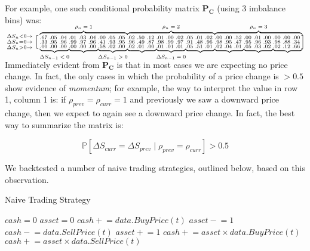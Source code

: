 \documentclass[12pt]{article}
\newcommand{\pluseq}{\mathrel{+}=}
\newcommand{\mineq}{\mathrel{-}=}
\newcommand\undermat[2]{%
  \makebox[0pt][l]{$\smash{\underbrace{\phantom{%
    \begin{smallmatrix}#2\end{smallmatrix}}}_{\text{$#1$}}}$}#2}
\newcommand\overmat[2]{%
  \makebox[0pt][l]{$\smash{\overbrace{\phantom{%
    \begin{smallmatrix}#2\end{smallmatrix}}}^{\text{$#1$}}}$}#2}
\newcommand\mat[1]{\boldsymbol{#1}}
\begin{document}
For example, one such conditional probability matrix $\mat{P_C}$ (using 3 imbalance bins) was:

$$  \begin{smallmatrix}
    \Delta S_n < 0 \rightarrow \\
    \Delta S_n = 0 \rightarrow \\
    \Delta S_n > 0 \rightarrow
  \end{smallmatrix}
  \left [
    \begin{smallmatrix}
\overmat{\rho_n = 1}{.67 & .05 & .04 & .01 & .03 & .04 & .00 & .05 & .05} & \overmat{\rho_n = 2}{.02 & .50 & .12 & .01 & .00 & .02 & .05 & .01 & .02} & 
\overmat{\rho_n = 3}{.00 & .00 & .52 & .00 & .01 & .00 & .00 & .00 & .00} \\
.33 & .95 & .96 & .99 & .97 & .96 & .41 & .93 & .95 & .96 & .49 & .87 & .98 & .99 & .97 & .91 & .48 & .96 & .98 & .95 & .47 & .95 & .96 & .93 & .98 & .88 & .34 \\ \undermat{\Delta S_{n-1} < 0}{.00 & .00 & .00} & 
\undermat{}{.00 & .00 & .00} & 
\undermat{\Delta S_{n-1} > 0}{.58 & .02 & .00} & 
\undermat{}{.02 & .01 & .00} & 
\undermat{\Delta S_{n-1} = 0}{.01 & .01 & .01} & 
\undermat{}{.05 & .51 & .01} & 
\undermat{}{.02 & .04 & .01} & 
\undermat{}{.05 & .03 & .02} & 
\undermat{}{.02 & .12 & .66}
    \end{smallmatrix}
  \right ]
$$

\vspace{0.5cm}
Immediately evident from $\mat{P_C}$ is that in most cases we are expecting no price change. In fact, the only cases in which the probability of a price change is $>0.5$ show evidence of \textit{momentum}; for example, the way to interpret the value in row 1, column 1 is: if $\rho_{prev} = \rho_{curr} = 1$ and previously we saw a downward price change, then we expect to again see a downward price change. In fact, the best way to summarize the matrix is:

$$ \mathbb{P} \left[ \Delta S_{curr} = \Delta S_{prev} \; | \; \rho_{prev} = \rho_{curr} \right] > 0.5 $$

We backtested a number of naive trading strategies, outlined below, based on this observation.

\begin{algorithm}
\caption{Naive Trading Strategy}
\begin{algorithmic}[1]
\State $cash = 0$
\State $asset = 0$
	\State $cash \pluseq data.BuyPrice(\textit{t})$
	\State $asset \mineq 1$
	\State $cash \mineq data.SellPrice(\textit{t})$	
	\State $asset \pluseq 1$
	\EndIf
\EndFor
{} 
\State $cash \pluseq asset \times data.BuyPrice(\textit{t})$
\State $cash \pluseq asset \times data.SellPrice(\textit{t})$	
\EndIf
\end{algorithmic}
\end{algorithm}
\end{document}
